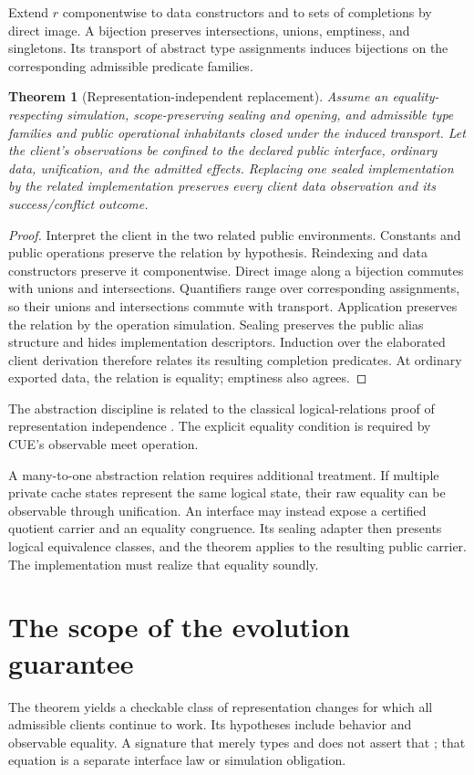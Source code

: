 \documentclass[11pt,a4paper,oneside]{report}
\newcommand{\code}[1]{\texttt{\detokenize{#1}}}
\newtheorem{theorem}[definition]{Theorem}
\theoremstyle{remark}
\begin{document}
Extend $r$ componentwise to data constructors and to sets of completions by
direct image. A bijection preserves intersections, unions, emptiness, and
singletons. Its transport of abstract type assignments induces bijections on
the corresponding admissible predicate families.

\begin{theorem}[Representation-independent replacement]\label{thm:abstraction}
Assume an equality-respecting simulation, scope-preserving sealing and opening,
and admissible type families and public operational inhabitants closed under
the induced transport. Let the client's observations be confined to the declared
public interface, ordinary data, unification, and the admitted effects. Replacing one sealed
implementation by the related implementation preserves every client data
observation and its success/conflict outcome.
\end{theorem}
\begin{proof}
Interpret the client in the two related public environments. Constants and
public operations preserve the relation by hypothesis. Reindexing and data
constructors preserve it componentwise. Direct image along a bijection commutes
with unions and intersections. Quantifiers range over corresponding assignments,
so their unions and intersections commute with transport. Application preserves
the relation by the operation simulation. Sealing preserves the public alias
structure and hides implementation descriptors. Induction over the elaborated
client derivation therefore relates its resulting completion predicates. At
ordinary exported data, the relation is equality; emptiness also agrees.
\end{proof}
The abstraction discipline is related to the classical logical-relations proof
of representation independence \cite{mitchell86,reynolds83}. The explicit
equality condition is required by CUE's observable meet operation.

A many-to-one abstraction relation requires additional treatment. If multiple
private cache states represent the same logical state, their raw equality can
be observable through unification. An interface may instead expose a certified
quotient carrier and an equality congruence. Its sealing adapter then presents
logical equivalence classes, and the theorem applies to the resulting public
carrier. The implementation must realize that equality soundly.

\section{The scope of the evolution guarantee}
The theorem yields a checkable class of representation changes for which all
admissible clients continue to work. Its hypotheses include behavior and
observable equality. A signature that merely types \code{next} and \code{read}
does not assert that \code{read(next(s)) = read(s)+1}; that equation is a separate
interface law or simulation obligation.
\end{document}
